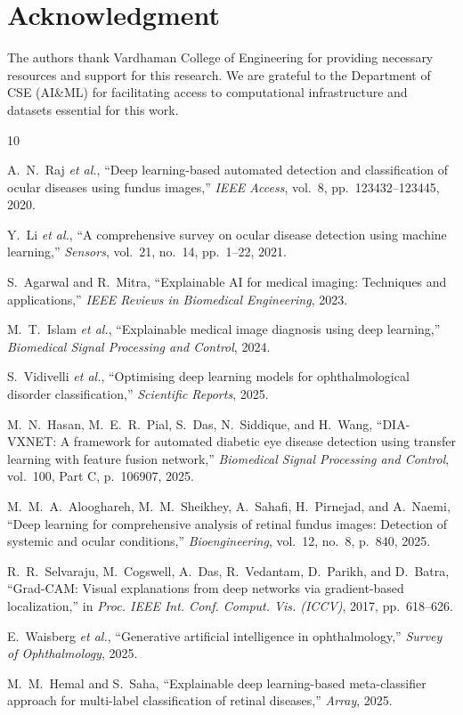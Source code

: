 \section*{Acknowledgment}
The authors thank Vardhaman College of Engineering for providing necessary resources and support for this research. We are grateful to the Department of CSE (AI\&ML) for facilitating access to computational infrastructure and datasets essential for this work.

\begin{thebibliography}{10}

A.~N.~Raj \textit{et al.}, ``Deep learning-based automated detection and classification of ocular diseases using fundus images,'' \textit{IEEE Access}, vol.~8, pp.~123432--123445, 2020.

Y.~Li \textit{et al.}, ``A comprehensive survey on ocular disease detection using machine learning,'' \textit{Sensors}, vol.~21, no.~14, pp.~1--22, 2021.

S.~Agarwal and R.~Mitra, ``Explainable AI for medical imaging: Techniques and applications,'' \textit{IEEE Reviews in Biomedical Engineering}, 2023.

M.~T.~Islam \textit{et al.}, ``Explainable medical image diagnosis using deep learning,'' \textit{Biomedical Signal Processing and Control}, 2024.

S.~Vidivelli \textit{et al.}, ``Optimising deep learning models for ophthalmological disorder classification,'' \textit{Scientific Reports}, 2025.

M.~N.~Hasan, M.~E.~R.~Pial, S.~Das, N.~Siddique, and H.~Wang, ``DIA-VXNET: A framework for automated diabetic eye disease detection using transfer learning with feature fusion network,'' \textit{Biomedical Signal Processing and Control}, vol.~100, Part C, p.~106907, 2025.

M.~M.~A.~Alooghareh, M.~M.~Sheikhey, A.~Sahafi, H.~Pirnejad, and A.~Naemi, ``Deep learning for comprehensive analysis of retinal fundus images: Detection of systemic and ocular conditions,'' \textit{Bioengineering}, vol.~12, no.~8, p.~840, 2025.

R.~R.~Selvaraju, M.~Cogswell, A.~Das, R.~Vedantam, D.~Parikh, and D.~Batra, ``Grad-CAM: Visual explanations from deep networks via gradient-based localization,'' in \textit{Proc. IEEE Int. Conf. Comput. Vis. (ICCV)}, 2017, pp.~618--626.

E.~Waisberg \textit{et al.}, ``Generative artificial intelligence in ophthalmology,'' \textit{Survey of Ophthalmology}, 2025.

M.~M.~Hemal and S.~Saha, ``Explainable deep learning-based meta-classifier approach for multi-label classification of retinal diseases,'' \textit{Array}, 2025.

\end{thebibliography}


